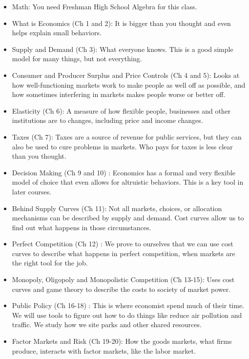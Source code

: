 \documentclass[
]{article}
\begin{document}
\begin{itemize}
\item
  Math: You need Freshman High School Algebra for this class.
\item
  What is Economics (Ch 1 and 2): It is bigger than you thought and even
  helps explain small behaviors.
\item
  Supply and Demand (Ch 3): What everyone knows. This is a good simple
  model for many things, but not everything.
\item
  Consumer and Producer Surplus and Price Controls (Ch 4 and 5): Looks
  at how well-functioning markets work to make people as well off as
  possible, and how sometimes interfering in markets makes people worse
  or better off.
\item
  Elasticity (Ch 6): A measure of how flexible people, businesses and
  other institutions are to changes, including price and income changes.
\item
  Taxes (Ch 7): Taxes are a source of revenue for public services, but
  they can also be used to cure problems in markets. Who pays for taxes
  is less clear than you thought.
\item
  Decision Making (Ch 9 and 10) : Economics has a formal and very
  flexible model of choice that even allows for altruistic behaviors.
  This is a key tool in later courses.
\item
  Behind Supply Curves (Ch 11): Not all markets, choices, or allocation
  mechanisms can be described by supply and demand. Cost curves allow us
  to find out what happens in those circumstances.
\item
  Perfect Competition (Ch 12) : We prove to ourselves that we can use
  cost curves to describe what happens in perfect competition, when
  markets are the right tool for the job.
\item
  Monopoly, Oligopoly and Monopolistic Competition (Ch 13-15): Uses cost
  curves and game theory to describe the costs to society of market
  power.
\item
  Public Policy (Ch 16-18) : This is where economist spend much of their
  time. We will use tools to figure out how to do things like reduce air
  pollution and traffic. We study how we site parks and other shared
  resources.
\item
  Factor Markets and Risk (Ch 19-20): How the goods markets, what firms
  produce, interacts with factor markets, like the labor market.
\end{itemize}
\end{document}
